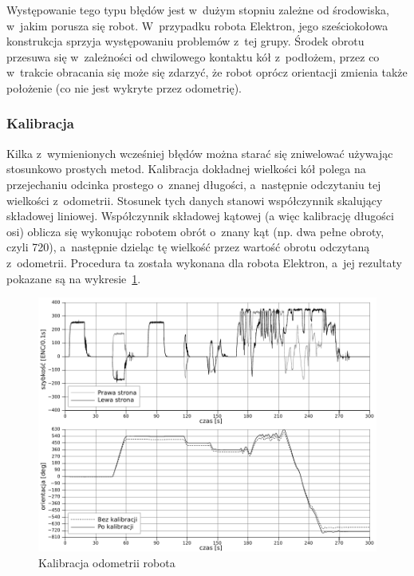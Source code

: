 Występowanie tego typu błędów jest w~dużym stopniu zależne od środowiska,
w~jakim porusza się robot. W~przypadku robota Elektron, jego sześciokołowa
konstrukcja sprzyja występowaniu problemów z~tej grupy. Środek obrotu przesuwa
się w~zależności od chwilowego kontaktu kół z~podłożem, przez co w~trakcie
obracania się może się zdarzyć, że robot oprócz orientacji zmienia także
położenie (co nie jest wykryte przez odometrię).

\subsubsection{Kalibracja}

Kilka z~wymienionych wcześniej błędów można starać się zniwelować używając
stosunkowo prostych metod. Kalibracja dokładnej wielkości kół polega na
przejechaniu odcinka prostego o~znanej długości, a~następnie odczytaniu tej
wielkości z~odometrii. Stosunek tych danych stanowi współczynnik skalujący
składowej liniowej. Współczynnik składowej kątowej (a więc kalibrację długości
osi) oblicza się wykonując robotem obrót o~znany kąt (np. dwa pełne obroty,
czyli 720\textdegree), a~następnie dzieląc tę wielkość przez wartość obrotu
odczytaną z~odometrii. Procedura ta została wykonana dla robota Elektron, a~jej
rezultaty pokazane są na wykresie~\ref{fig:odom_calib}.

\begin{figure}[ht!]
\centering
\includegraphics[width=\textwidth]{../../Common/pomiary/odom_calib_bw}
\caption{Kalibracja odometrii robota}
\label{fig:odom_calib}
\end{figure}

